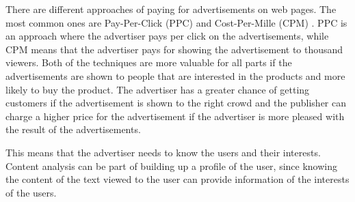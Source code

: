 There are different approaches of paying for advertisements on web pages. The most common ones are Pay-Per-Click (PPC) \cite{wiki:ppc} and Cost-Per-Mille (CPM) \cite{wiki:ppc}. PPC is an approach where the advertiser pays per click on the advertisements, while CPM means that the advertiser pays for showing the advertisement to thousand viewers. 
Both of the techniques are more valuable for all parts if the advertisements are shown to people that are interested in the products and more likely to buy the product. The advertiser has a greater chance of getting customers if the advertisement is shown to the right crowd and the publisher can charge a higher price for the advertisement if the advertiser is more pleased with the result of the advertisements.

This means that the advertiser needs to know the users and their interests. Content analysis can be part of building up a profile of the user, since knowing the content of the text viewed to the user can provide information of the interests of the users. 

